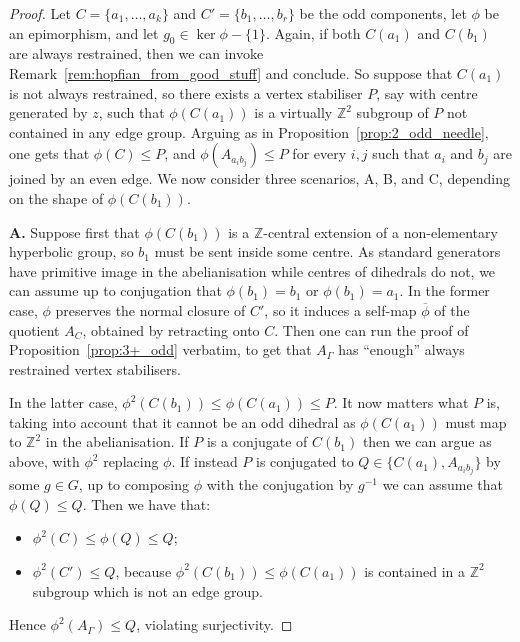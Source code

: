 \documentclass[10pt,a4paper]{amsart}
\theoremstyle{plain}
\newcommand{\Z}{\mathbb{Z}}
\newcommand{\ov}[1]{\overline{#1}}
\newcommand{\good}{always restrained}
\begin{document}
\begin{proof}
    Let $C=\{a_1,\ldots, a_k\}$ and $C'=\{b_1,\ldots, b_r\}$ be the odd components, let $\phi$ be an epimorphism, and let $g_0\in\ker\phi-\{1\}$. Again, if both $C(a_1)$ and $C(b_1)$ are \good{}, then we can invoke Remark~\ref{rem:hopfian_from_good_stuff} and conclude. So suppose that $C(a_1)$ is not \good{}, so there exists a vertex stabiliser $P$, say with centre generated by $z$, such that $\phi(C(a_1))$ is a virtually $\Z^2$ subgroup of $P$ not contained in any edge group. Arguing as in Proposition~\ref{prop:2_odd_needle}, one gets that $\phi(C)\le P$, and $\phi(A_{a_ib_j})\le P$ for every $i,j$ such that $a_i$ and $b_j$ are joined by an even edge. We now consider three scenarios, A, B, and C, depending on the shape of $\phi(C(b_1))$. 
    \par\medskip
    \textbf{A.}
    Suppose first that $\phi(C(b_1))$ is a $\Z$-central extension of a non-elementary hyperbolic group, so $b_1$ must be sent inside some centre. As standard generators have primitive image in the abelianisation while centres of dihedrals do not, we can assume up to conjugation that $\phi(b_1)=b_1$ or $\phi(b_1)=a_1$. In the former case, $\phi$ preserves the normal closure of $C'$, so it induces a self-map $\ov\phi$ of the quotient $A_C$, obtained by retracting onto $C$. Then one can run the proof of Proposition~\ref{prop:3+_odd} verbatim, to get that $A_\Gamma$ has “enough” \good{} vertex stabilisers. 
\par\medskip

    In the latter case, $\phi^2(C(b_1))\le \phi(C(a_1))\le P$. It now matters what $P$ is, taking into account that it cannot be an odd dihedral as $\phi(C(a_1))$ must map to $\Z^2$ in the abelianisation. If $P$ is a conjugate of $C(b_1)$ then we can argue as above, with $\phi^2$ replacing $\phi$. If instead $P$ is conjugated to $Q\in\{C(a_1),A_{a_ib_j}\}$ by some $g\in G$, up to composing $\phi$ with the conjugation by $g^{-1}$ we can assume that $\phi(Q)\le Q$. Then we have that:
    \begin{itemize}
        \item $\phi^2(C)\le \phi(Q)\le Q$;
        \item $\phi^2(C')\le Q$, because $\phi^2(C(b_1))\le \phi(C(a_1))$ is contained in a $\Z^2$ subgroup which is not an edge group. 
    \end{itemize}
    Hence $\phi^2(A_\Gamma)\le Q$, violating surjectivity.


\end{proof}
\end{document}
